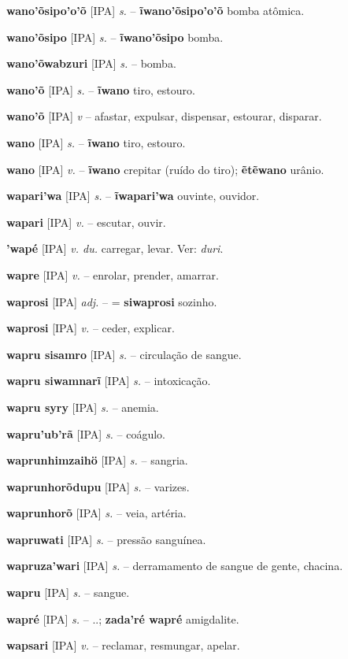 \textbf{wano'õsipo'o'õ} [IPA] \textit{s.} -- \textbf{ĩwano'õsipo'o'õ} bomba atômica.

\textbf{wano'õsipo} [IPA] \textit{s.} -- \textbf{ĩwano'õsipo} bomba.

\textbf{wano'õwabzuri} [IPA] \textit{s.} -- bomba.

\textbf{wano'õ} [IPA] \textit{s.} -- \textbf{ĩwano} tiro, estouro.

\textbf{wano'õ} [IPA] \textit{v} -- afastar, expulsar, dispensar, estourar, disparar.

\textbf{wano} [IPA] \textit{s.} -- \textbf{ĩwano} tiro, estouro.

\textbf{wano} [IPA] \textit{v.} -- \textbf{ĩwano} crepitar (ruído do tiro); \textbf{ẽtẽwano} urânio.

\textbf{wapari'wa} [IPA] \textit{s.} -- \textbf{ĩwapari'wa} ouvinte, ouvidor.

\textbf{wapari} [IPA] \textit{v.} -- escutar, ouvir.

\textbf{'wapé} [IPA] \textit{v. du.} carregar, levar. Ver: \textit{duri}.

\textbf{wapre} [IPA] \textit{v.} -- enrolar, prender, amarrar.

\textbf{waprosi} [IPA] \textit{adj.} -- = \textbf{siwaprosi} sozinho.

\textbf{waprosi} [IPA] \textit{v.} -- ceder, explicar.

\textbf{wapru sisamro} [IPA] \textit{s.} -- circulação de sangue.

\textbf{wapru siwamnarĩ} [IPA] \textit{s.} -- intoxicação.

\textbf{wapru syry} [IPA] \textit{s.} -- anemia.

\textbf{wapru'ub'rã} [IPA] \textit{s.} -- coágulo.

\textbf{waprunhimzaihö} [IPA] \textit{s.} -- sangria.

\textbf{waprunhorõdupu} [IPA] \textit{s.} -- varizes.

\textbf{waprunhorõ} [IPA] \textit{s.} -- veia, artéria.

\textbf{wapruwati} [IPA] \textit{s.} -- pressão sanguínea.

\textbf{wapruza'wari} [IPA] \textit{s.} -- derramamento de sangue de gente, chacina.

\textbf{wapru} [IPA] \textit{s.} -- sangue.

\textbf{wapré} [IPA] \textit{s.} -- ..; \textbf{zada'ré wapré} amigdalite.

\textbf{wapsari} [IPA] \textit{v.} -- reclamar, resmungar, apelar.

